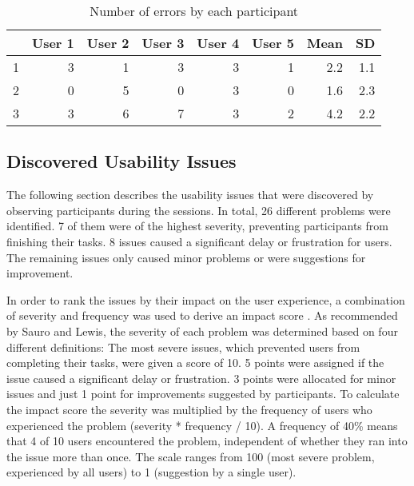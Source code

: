 
\begin{table}[h!]
\begin{tabular}{|r|r|r|r|r|r|r|r|}
\hline
\rowcolor[HTML]{EFEFEF}
\multicolumn{1}{|l|}{\cellcolor[HTML]{EFEFEF}\textbf{Scenario}} & \multicolumn{1}{l|}{\cellcolor[HTML]{EFEFEF}\textbf{User 1}} & \multicolumn{1}{l|}{\cellcolor[HTML]{EFEFEF}\textbf{User 2}} & \multicolumn{1}{l|}{\cellcolor[HTML]{EFEFEF}\textbf{User 3}} & \multicolumn{1}{l|}{\cellcolor[HTML]{EFEFEF}\textbf{User 4}} & \multicolumn{1}{l|}{\cellcolor[HTML]{EFEFEF}\textbf{User 5}} & \multicolumn{1}{l|}{\cellcolor[HTML]{EFEFEF}\textbf{Mean}} & \multicolumn{1}{l|}{\cellcolor[HTML]{EFEFEF}\textbf{SD}} \\ \hline
\cellcolor[HTML]{EFEFEF}1 & 3 & 1 & 3 & 3 & 1 & 2.2 & 1.1 \\ \hline
\cellcolor[HTML]{EFEFEF}2 & 0 & 5 & 0 & 3 & 0 & 1.6 & 2.3 \\ \hline
\cellcolor[HTML]{EFEFEF}3 & 3 & 6 & 7 & 3 & 2 & 4.2 & 2.2 \\ \hline
\end{tabular}
\centering
\caption{Number of errors by each participant}
\label{table:error-rate}
\end{table}

\subsection{Discovered Usability Issues} \label{sec:usability-issues-1st-study}
The following section describes the usability issues that were discovered by observing participants during the sessions. In total, 26 different problems were identified. 7 of them were of the highest severity, preventing participants from finishing their tasks. 8 issues caused a significant delay or frustration for users. The remaining issues only caused minor problems or were suggestions for improvement.

In order to rank the issues by their impact on the user experience, a combination of severity and frequency was used to derive an impact score \cite{sauro_quantifying_2012}. As recommended by Sauro and Lewis, the severity of each problem was determined based on four different definitions: The most severe issues, which prevented users from completing their tasks, were given a score of 10. 5 points were assigned if the issue caused a significant delay or frustration. 3 points were allocated for minor issues and just 1 point for improvements suggested by participants. To calculate the impact score the severity was multiplied by the frequency of users who experienced the problem (severity * frequency / 10). A frequency of 40\% means that 4 of 10 users encountered the problem, independent of whether they ran into the issue more than once. The scale ranges from 100 (most severe problem, experienced by all users) to 1 (suggestion by a single user).

